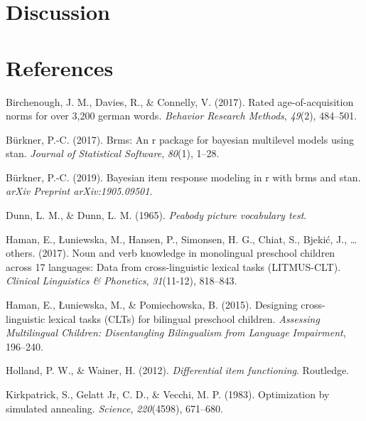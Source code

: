 \documentclass[
  man,floatsintext]{apa6}
\newlength{\cslhangindent}
\newlength{\cslentryspacingunit} %
\newenvironment{CSLReferences}[2] %
 {%
  \setlength{\parindent}{0pt}
  \ifodd #1
  \let\oldpar\par
  \def\par{\hangindent=\cslhangindent\oldpar}
  \fi
  \setlength{\parskip}{#2\cslentryspacingunit}
 }%
 {}
\begin{document}
\hypertarget{discussion}{%
\section{Discussion}\label{discussion}}

\newpage

\hypertarget{references}{%
\section{References}\label{references}}

\hypertarget{refs}{}
\begin{CSLReferences}{1}{0}
\leavevmode{}%
Birchenough, J. M., Davies, R., \& Connelly, V. (2017). Rated age-of-acquisition norms for over 3,200 german words. \emph{Behavior Research Methods}, \emph{49}(2), 484--501.

\leavevmode{}%
Bürkner, P.-C. (2017). Brms: An r package for bayesian multilevel models using stan. \emph{Journal of Statistical Software}, \emph{80}(1), 1--28.

\leavevmode{}%
Bürkner, P.-C. (2019). Bayesian item response modeling in r with brms and stan. \emph{arXiv Preprint arXiv:1905.09501}.

\leavevmode{}%
Dunn, L. M., \& Dunn, L. M. (1965). \emph{Peabody picture vocabulary test}.

\leavevmode{}%
Haman, E., Łuniewska, M., Hansen, P., Simonsen, H. G., Chiat, S., Bjekić, J., \ldots{} others. (2017). Noun and verb knowledge in monolingual preschool children across 17 languages: Data from cross-linguistic lexical tasks (LITMUS-CLT). \emph{Clinical Linguistics \& Phonetics}, \emph{31}(11-12), 818--843.

\leavevmode{}%
Haman, E., Łuniewska, M., \& Pomiechowska, B. (2015). Designing cross-linguistic lexical tasks (CLTs) for bilingual preschool children. \emph{Assessing Multilingual Children: Disentangling Bilingualism from Language Impairment}, 196--240.

\leavevmode{}%
Holland, P. W., \& Wainer, H. (2012). \emph{Differential item functioning}. Routledge.

\leavevmode{}%
Kirkpatrick, S., Gelatt Jr, C. D., \& Vecchi, M. P. (1983). Optimization by simulated annealing. \emph{Science}, \emph{220}(4598), 671--680.


\end{CSLReferences}
\end{document}
